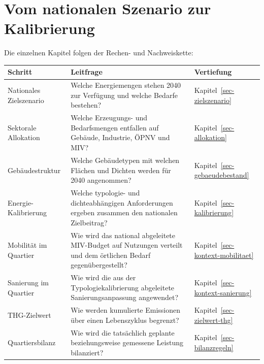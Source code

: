 \documentclass[
  ngerman,
  a4paper,
  DIV=11]{scrreprt}
\newcounter{none} %
\begin{document}
\section{Vom nationalen Szenario zur
Kalibrierung}\label{vom-nationalen-szenario-zur-kalibrierung}

Die einzelnen Kapitel folgen der Rechen- und Nachweiskette:

{\def\LTcaptype{none} %
\begin{longtable}[]{@{}
  >{\raggedright\arraybackslash}p{}
  >{\raggedright\arraybackslash}p{}
  >{\raggedright\arraybackslash}p{}@{}}
\toprule\noalign{}
\begin{minipage}[b]{\linewidth}\raggedright
Schritt
\end{minipage} & \begin{minipage}[b]{\linewidth}\raggedright
Leitfrage
\end{minipage} & \begin{minipage}[b]{\linewidth}\raggedright
Vertiefung
\end{minipage} \\
\midrule\noalign{}
\endhead
\bottomrule\noalign{}
\endlastfoot
Nationales Zielszenario & Welche Energiemengen stehen 2040 zur Verfügung
und welche Bedarfe bestehen? & Kapitel~\ref{sec-zielszenario} \\
Sektorale Allokation & Welche Erzeugungs- und Bedarfsmengen entfallen
auf Gebäude, Industrie, ÖPNV und MIV? & Kapitel~\ref{sec-allokation} \\
Gebäudestruktur & Welche Gebäudetypen mit welchen Flächen und Dichten
werden für 2040 angenommen? & Kapitel~\ref{sec-gebaeudebestand} \\
Energie-Kalibrierung & Welche typologie- und dichteabhängigen
Anforderungen ergeben zusammen den nationalen Zielbeitrag? &
Kapitel~\ref{sec-kalibrierung} \\
Mobilität im Quartier & Wie wird das national abgeleitete MIV-Budget auf
Nutzungen verteilt und dem örtlichen Bedarf gegenübergestellt? &
Kapitel~\ref{sec-kontext-mobilitaet} \\
Sanierung im Quartier & Wie wird die aus der Typologiekalibrierung
abgeleitete Sanierungsanpassung angewendet? &
Kapitel~\ref{sec-kontext-sanierung} \\
THG-Zielwert & Wie werden kumulierte Emissionen über einen Lebenszyklus
begrenzt? & Kapitel~\ref{sec-zielwert-thg} \\
Quartiersbilanz & Wie wird die tatsächlich geplante beziehungsweise
gemessene Leistung bilanziert? & Kapitel~\ref{sec-bilanzregeln} \\
\end{longtable}
}
\end{document}
